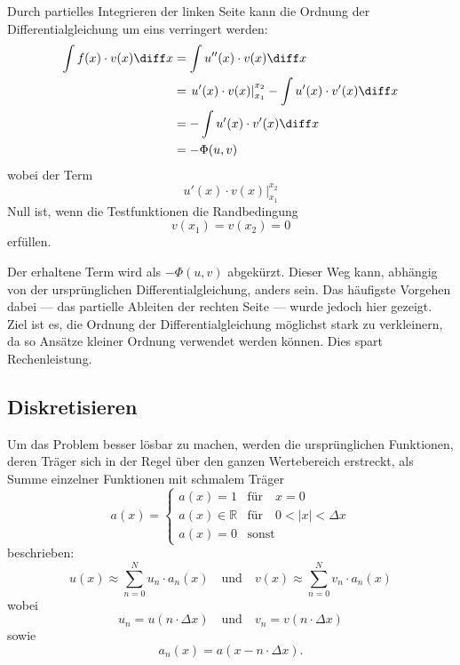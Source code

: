 Durch partielles Integrieren der linken Seite kann die Ordnung der Differentialgleichung um eins verringert werden:
\begin{align}
    \int f(x) \cdot v(x) \diff x &= \int u''(x) \cdot v(x) \diff x \\
                                 &= \left. u'(x) \cdot v(x) \right|_{x_1}^{x_2} - \int u'(x) \cdot v'(x) \diff x \\
                                 &= - \int u'(x) \cdot v'(x) \diff x \\
                                 &= - \Phi(u, v)
\end{align}
wobei der Term
\begin{equation}
    \left. u'(x) \cdot v(x) \right|_{x_1}^{x_2}
\end{equation}
Null ist, wenn die Testfunktionen die Randbedingung
\begin{equation}
    v(x_1) = v(x_2) = 0
\end{equation}
erfüllen. %

Der erhaltene Term wird als $-\Phi(u, v)$ abgekürzt.
Dieser Weg kann, abhängig von der ursprünglichen Differentialgleichung, anders sein.
Das häufigste Vorgehen dabei --- das partielle Ableiten der rechten Seite --- wurde jedoch hier gezeigt.
Ziel ist es, die Ordnung der Differentialgleichung möglichst stark zu verkleinern, da so Ansätze kleiner Ordnung verwendet werden können.
Dies spart Rechenleistung.


\subsection{Diskretisieren\label{fem:1d:diskretisieren}}
Um das Problem besser lösbar zu machen, werden die ursprünglichen Funktionen, deren Träger sich in der Regel über den ganzen Wertebereich erstreckt, als Summe einzelner Funktionen mit schmalem Träger 
\begin{equation}
    a(x) = \left\{ \begin{array}{ll}
        a(x) = 1            & \text{für} \quad x = 0 \\
        a(x) \in \mathbb{R} & \text{für} \quad 0 < |x| < \Delta x \\
        a(x) = 0            & \text{sonst} 
    \end{array} \right.
\end{equation}
beschrieben:
\begin{equation}
    u(x) \approx \sum_{n=0}^{N}{u_n \cdot a_n(x)} \quad
    \text{und} \quad
    v(x) \approx \sum_{n=0}^{N}{v_n \cdot a_n(x)}
\end{equation}
wobei 
\begin{equation}
    u_n = u(n \cdot \Delta x) \quad
    \text{und} \quad
     v_n = v(n \cdot \Delta x)
\end{equation}
sowie 
\begin{equation}
    a_n(x) = a(x - n \cdot \Delta x).
\end{equation}


